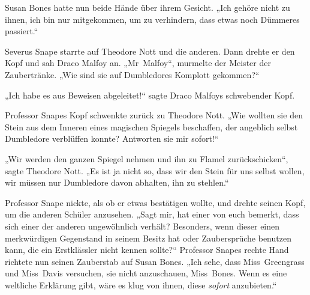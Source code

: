Susan Bones hatte nun beide Hände über ihrem Gesicht.
„Ich gehöre nicht zu ihnen, ich bin nur mitgekommen, um zu verhindern, dass etwas noch Dümmeres passiert.“

Severus Snape starrte auf Theodore Nott und die anderen. Dann drehte er den Kopf und sah Draco Malfoy an.
„Mr~Malfoy“, murmelte der Meister der Zaubertränke.
„Wie sind sie auf Dumbledores Komplott gekommen?“

„Ich habe es aus Beweisen abgeleitet!“ sagte Draco Malfoys schwebender Kopf.

Professor Snapes Kopf schwenkte zurück zu Theodore Nott.
„Wie wollten sie den Stein aus dem Inneren eines magischen Spiegels beschaffen, der angeblich selbst Dumbledore verblüffen konnte? Antworten sie mir sofort!“

„Wir werden den ganzen Spiegel nehmen und ihn zu Flamel zurückschicken“, sagte Theodore Nott.
„Es ist ja nicht so, dass wir den Stein für uns selbst wollen, wir müssen nur Dumbledore davon abhalten, ihn zu stehlen.“

Professor Snape nickte, als ob er etwas bestätigen wollte, und drehte seinen Kopf, um die anderen Schüler anzusehen.
„Sagt mir, hat einer von euch bemerkt, dass sich einer der anderen ungewöhnlich verhält? Besonders, wenn dieser einen merkwürdigen Gegenstand in seinem Besitz hat oder Zaubersprüche benutzen kann, die ein Erstklässler nicht kennen sollte?“
Professor Snapes rechte Hand richtete nun seinen Zauberstab auf Susan Bones.
„Ich sehe, dass Miss~Greengrass und Miss~Davis versuchen, sie nicht anzuschauen, Miss~Bones. Wenn es eine weltliche Erklärung gibt, wäre es klug von ihnen, diese \emph{sofort} anzubieten.“

